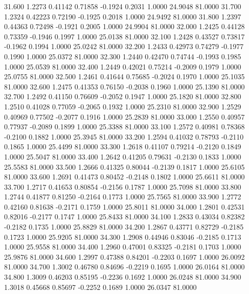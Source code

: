   31.600   1.2273   0.41142   0.71858  -0.1924   0.2031   1.0000  24.9048  81.0000
  31.700   1.2324   0.42223   0.72190  -0.1925   0.2018   1.0000  24.9492  81.0000
  31.800   1.2397   0.44363   0.72498  -0.1921   0.2005   1.0000  24.9904  81.0000
  32.000   1.2425   0.44128   0.73359  -0.1946   0.1997   1.0000  25.0138  81.0000
  32.100   1.2428   0.43527   0.73817  -0.1962   0.1994   1.0000  25.0242  81.0000
  32.200   1.2433   0.42973   0.74279  -0.1977   0.1990   1.0000  25.0372  81.0000
  32.300   1.2440   0.42470   0.74744  -0.1993   0.1985   1.0000  25.0539  81.0000
  32.400   1.2449   0.42021   0.75214  -0.2009   0.1979   1.0000  25.0755  81.0000
  32.500   1.2461   0.41644   0.75685  -0.2024   0.1970   1.0000  25.1035  81.0000
  32.600   1.2475   0.41353   0.76150  -0.2038   0.1960   1.0000  25.1390  81.0000
  32.700   1.2492   0.41150   0.76609  -0.2052   0.1947   1.0000  25.1820  81.0000
  32.800   1.2510   0.41028   0.77059  -0.2065   0.1932   1.0000  25.2310  81.0000
  32.900   1.2529   0.40969   0.77502  -0.2077   0.1916   1.0000  25.2839  81.0000
  33.000   1.2550   0.40957   0.77937  -0.2089   0.1899   1.0000  25.3388  81.0000
  33.100   1.2572   0.40981   0.78368  -0.2100   0.1882   1.0000  25.3945  81.0000
  33.200   1.2594   0.41032   0.78793  -0.2110   0.1865   1.0000  25.4499  81.0000
  33.300   1.2618   0.41107   0.79214  -0.2120   0.1849   1.0000  25.5047  81.0000
  33.400   1.2642   0.41205   0.79631  -0.2130   0.1833   1.0000  25.5583  81.0000
  33.500   1.2666   0.41325   0.80044  -0.2139   0.1817   1.0000  25.6105  81.0000
  33.600   1.2691   0.41473   0.80452  -0.2148   0.1802   1.0000  25.6611  81.0000
  33.700   1.2717   0.41653   0.80854  -0.2156   0.1787   1.0000  25.7098  81.0000
  33.800   1.2744   0.41877   0.81250  -0.2164   0.1773   1.0000  25.7565  81.0000
  33.900   1.2772   0.42160   0.81638  -0.2171   0.1759   1.0000  25.8011  81.0000
  34.000   1.2801   0.42531   0.82016  -0.2177   0.1747   1.0000  25.8433  81.0000
  34.100   1.2833   0.43034   0.82382  -0.2182   0.1735   1.0000  25.8829  81.0000
  34.200   1.2867   0.43771   0.82729  -0.2185   0.1723   1.0000  25.9205  81.0000
  34.300   1.2908   0.44946   0.83046  -0.2185   0.1713   1.0000  25.9558  81.0000
  34.400   1.2960   0.47001   0.83325  -0.2181   0.1703   1.0000  25.9876  81.0000
  34.600   1.2997   0.47388   0.84201  -0.2203   0.1697   1.0000  26.0092  81.0000
  34.700   1.3002   0.46780   0.84696  -0.2219   0.1695   1.0000  26.0164  81.0000
  34.800   1.3009   0.46203   0.85195  -0.2236   0.1692   1.0000  26.0248  81.0000
  34.900   1.3018   0.45668   0.85697  -0.2252   0.1689   1.0000  26.0347  81.0000
